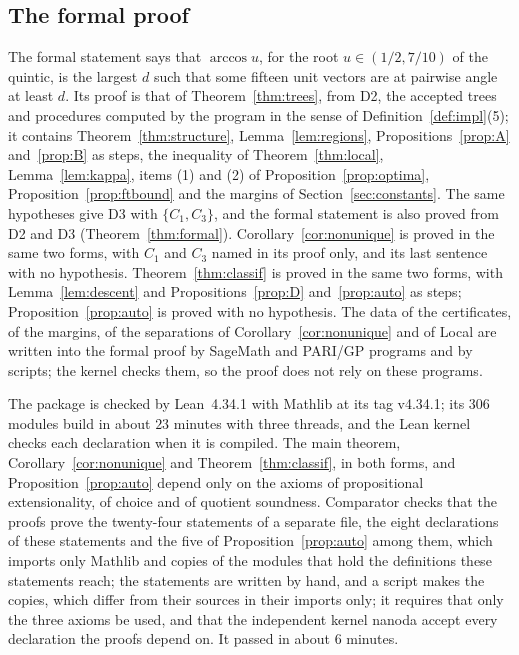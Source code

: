 \documentclass[12pt]{amsart}
\theoremstyle{definition}
\theoremstyle{plain}
\theoremstyle{definition}
\newcommand{\CI}{C_1}
\newcommand{\CIII}{C_3}
\newcommand{\codemap}[1]{\ignorespaces}
\begin{document}
\subsection{The formal proof}\label{sec:formal}\codemap{code/lean/check.sh > code/lean/check.out code/lean/build.out, code/lean/challenge.sh > code/lean/challenge.out, code/lean/comparator.sh > code/lean/comparator.out, code/lean-data/regen.sh > code/lean-data/regen.out}
The formal statement says that $\arccos u$, for the root $u\in(1/2,7/10)$ of the quintic, is the largest $d$ such that some fifteen unit vectors are at pairwise angle at least $d$. Its proof is that of Theorem~\ref{thm:trees}, from D2, the accepted trees and procedures computed by the program in the sense of Definition~\ref{def:impl}(5); it contains Theorem~\ref{thm:structure}, Lemma~\ref{lem:regions}, Propositions~\ref{prop:A} and~\ref{prop:B} as steps, the inequality of Theorem~\ref{thm:local}, Lemma~\ref{lem:kappa}, items (1) and (2) of Proposition~\ref{prop:optima}, Proposition~\ref{prop:ftbound} and the margins of Section~\ref{sec:constants}. The same hypotheses give D3 with $\{\CI,\CIII\}$, and the formal statement is also proved from D2 and D3 (Theorem~\ref{thm:formal}). Corollary~\ref{cor:nonunique} is proved in the same two forms, with $\CI$ and $\CIII$ named in its proof only, and its last sentence with no hypothesis. Theorem~\ref{thm:classif} is proved in the same two forms, with Lemma~\ref{lem:descent} and Propositions~\ref{prop:D} and~\ref{prop:auto} as steps; Proposition~\ref{prop:auto} is proved with no hypothesis. The data of the certificates, of the margins, of the separations of Corollary~\ref{cor:nonunique} and of Local are written into the formal proof by SageMath and PARI/GP programs and by scripts; the kernel checks them, so the proof does not rely on these programs.

The package is checked by Lean~4.34.1 with Mathlib at its tag v4.34.1; its $306$ modules build in about $23$ minutes with three threads, and the Lean kernel checks each declaration when it is compiled. The main theorem, Corollary~\ref{cor:nonunique} and Theorem~\ref{thm:classif}, in both forms, and Proposition~\ref{prop:auto} depend only on the axioms of propositional extensionality, of choice and of quotient soundness. Comparator \cite{Comparator} checks that the proofs prove the twenty-four statements of a separate file, the eight declarations of these statements and the five of Proposition~\ref{prop:auto} among them, which imports only Mathlib and copies of the modules that hold the definitions these statements reach; the statements are written by hand, and a script makes the copies, which differ from their sources in their imports only; it requires that only the three axioms be used, and that the independent kernel nanoda \cite{nanoda} accept every declaration the proofs depend on. It passed in about $6$ minutes.
\end{document}
